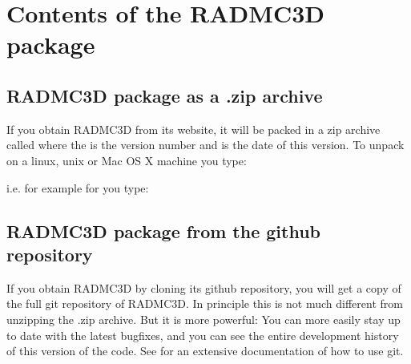 \documentclass[letterpaper,10pt,english]{sphinxmanual}
\begin{document}
\section{Contents of the RADMC\sphinxhyphen{}3D package}
\label{\detokenize{overview:contents-of-the-radmc-3d-package}}

\subsection{RADMC\sphinxhyphen{}3D package as a .zip archive}
\label{\detokenize{overview:radmc-3d-package-as-a-zip-archive}}
If you obtain RADMC\sphinxhyphen{}3D from its website, it will be
packed in a zip archive called
 where the  is the version
number and  is the date of this version.
To unpack on a linux, unix or Mac OS X machine you type:

\begin{sphinxVerbatim}[commandchars=\\\{\}]
   
\end{sphinxVerbatim}

i.e. for example for  you type:

\begin{sphinxVerbatim}[commandchars=\\\{\}]
 
\end{sphinxVerbatim}


\subsection{RADMC\sphinxhyphen{}3D package from the github repository}
\label{\detokenize{overview:radmc-3d-package-from-the-github-repository}}
If you obtain RADMC\sphinxhyphen{}3D by cloning its github repository, you will get
a copy of the full git repository of RADMC\sphinxhyphen{}3D. In principle this is
not much different from unzipping the .zip archive. But it is more
powerful: You can more easily stay up to date with the latest bugfixes,
and you can see the entire development history of this version of the
code. See  for an extensive documentation
of how to use git.
\end{document}
